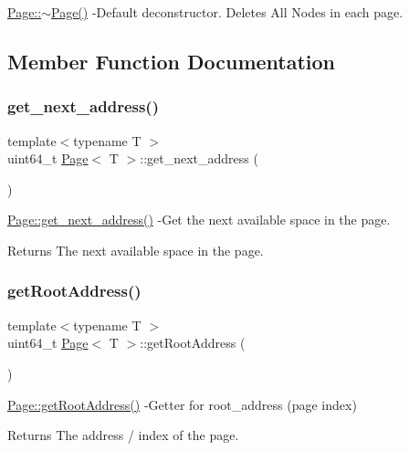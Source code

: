 \hyperlink{class_page_a7312a131c7f52718cf4f2b6f487d31bf}{Page\+::$\sim$\+Page()} -\/\+Default deconstructor. Deletes All Nodes in each page. 

\subsection{Member Function Documentation}
\mbox{\label{class_page_ae6ac153d53ddb0493a4fff270dfa42cb}} 
\subsubsection{\texorpdfstring{get\+\_\+next\+\_\+address()}{get\_next\_address()}}
{\footnotesize\ttfamily template$<$typename T $>$ \\
uint64\+\_\+t \hyperlink{class_page}{Page}$<$ T $>$\+::get\+\_\+next\+\_\+address (\begin{DoxyParamCaption}{ }\end{DoxyParamCaption})}

\hyperlink{class_page_ae6ac153d53ddb0493a4fff270dfa42cb}{Page\+::get\+\_\+next\+\_\+address()} -\/\+Get the next available space in the page. \begin{DoxyReturn}{Returns}
The next available space in the page. 
\end{DoxyReturn}
\mbox{\label{class_page_a438a928e0ce67dc404f183678eb533ec}} 
\subsubsection{\texorpdfstring{get\+Root\+Address()}{getRootAddress()}}
{\footnotesize\ttfamily template$<$typename T $>$ \\
uint64\+\_\+t \hyperlink{class_page}{Page}$<$ T $>$\+::get\+Root\+Address (\begin{DoxyParamCaption}{ }\end{DoxyParamCaption})}

\hyperlink{class_page_a438a928e0ce67dc404f183678eb533ec}{Page\+::get\+Root\+Address()} -\/\+Getter for root\+\_\+address (page index) \begin{DoxyReturn}{Returns}
The address / index of the page. 
\end{DoxyReturn}
\mbox{\label{class_page_a8c27abd6fb2ce55c05b065584b4bcc75}} 

